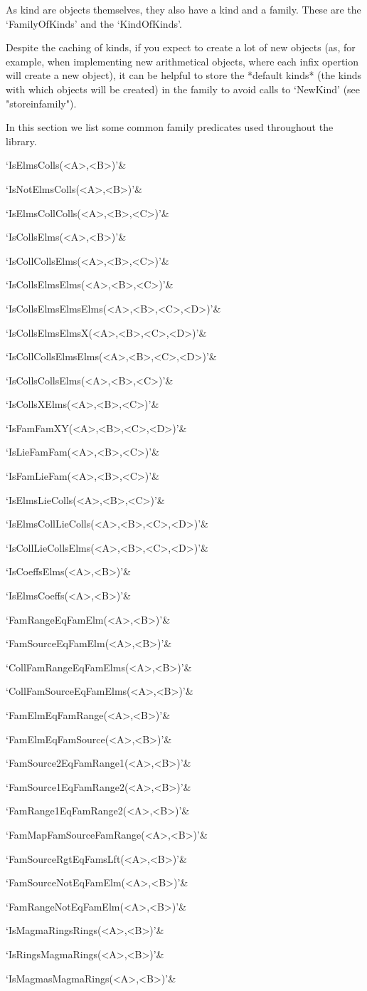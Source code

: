 \danger
As kind are objects themselves, they also have a kind and a family.
These are the `FamilyOfKinds' and the `KindOfKinds'.

\danger
Despite the caching of kinds, if you expect to create a lot of
new objects (as, for example, when implementing new arithmetical objects,
where each infix opertion will create a new object), it can be helpful to
store the *default kinds* (the kinds with which objects will be
created) in the family to avoid calls to `NewKind' (see "storeinfamily").



In this section we list some common family predicates used throughout the
library.

\beginitems
`IsElmsColls(<A>,<B>)'&

`IsNotElmsColls(<A>,<B>)'&

`IsElmsCollColls(<A>,<B>,<C>)'&

`IsCollsElms(<A>,<B>)'&

`IsCollCollsElms(<A>,<B>,<C>)'&

`IsCollsElmsElms(<A>,<B>,<C>)'&

`IsCollsElmsElmsElms(<A>,<B>,<C>,<D>)'&

`IsCollsElmsElmsX(<A>,<B>,<C>,<D>)'&

`IsCollCollsElmsElms(<A>,<B>,<C>,<D>)'&

`IsCollsCollsElms(<A>,<B>,<C>)'&

`IsCollsXElms(<A>,<B>,<C>)'&

`IsFamFamXY(<A>,<B>,<C>,<D>)'&

`IsLieFamFam(<A>,<B>,<C>)'&

`IsFamLieFam(<A>,<B>,<C>)'&

`IsElmsLieColls(<A>,<B>,<C>)'&

`IsElmsCollLieColls(<A>,<B>,<C>,<D>)'&

`IsCollLieCollsElms(<A>,<B>,<C>,<D>)'&

`IsCoeffsElms(<A>,<B>)'&

`IsElmsCoeffs(<A>,<B>)'&

`FamRangeEqFamElm(<A>,<B>)'&

`FamSourceEqFamElm(<A>,<B>)'&

`CollFamRangeEqFamElms(<A>,<B>)'&

`CollFamSourceEqFamElms(<A>,<B>)'&

`FamElmEqFamRange(<A>,<B>)'&

`FamElmEqFamSource(<A>,<B>)'&

`FamSource2EqFamRange1(<A>,<B>)'&

`FamSource1EqFamRange2(<A>,<B>)'&

`FamRange1EqFamRange2(<A>,<B>)'&

`FamMapFamSourceFamRange(<A>,<B>)'&

`FamSourceRgtEqFamsLft(<A>,<B>)'&

`FamSourceNotEqFamElm(<A>,<B>)'&

`FamRangeNotEqFamElm(<A>,<B>)'&

`IsMagmaRingsRings(<A>,<B>)'&

`IsRingsMagmaRings(<A>,<B>)'&

`IsMagmasMagmaRings(<A>,<B>)'&

\enditems

